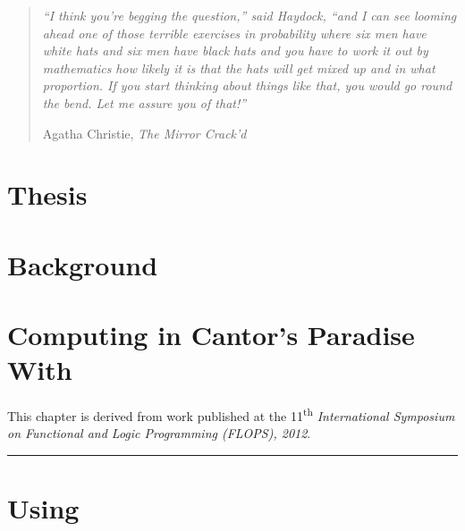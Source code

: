 \documentclass[phd,letterpaper,lof,chaptercenter,parttop,electronic]{byumsphd}
\title{\Title}
\author{\Author}
\begin{document}
\maketitle
{}

\vspace*{\fill}
\begin{quote}
\textit{``I think you're begging the question,'' said Haydock, ``and I can see looming ahead one of those terrible exercises in probability where six men have white hats and six men have black hats and you have to work it out by mathematics how likely it is that the hats will get mixed up and in what proportion. If you start thinking about things like that, you would go round the bend. Let me assure you of that!''}

\hfill Agatha Christie, \textit{The Mirror Crack'd}
\end{quote}
\vspace*{\fill}

\chapter{Thesis}




\chapter{Background}
\label{ch:background}




\chapter{Computing in Cantor's Paradise With \lzfclang}
\label{ch:lambda-zfc}

This chapter is derived from work published at the 11\textsuperscript{th} \emph{International Symposium on Functional and Logic Programming (FLOPS), 2012}.

\vspace{\baselineskip}
\hrule
\vspace{\baselineskip}




\chapter{Using \lzfclang}
\label{ch:using-lambda-zfc}
\end{document}
